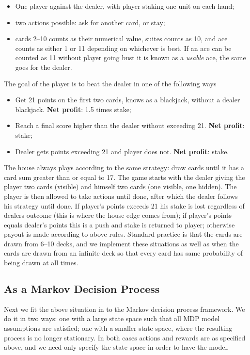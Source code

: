 \begin{itemize}
	\item One player against the dealer, with player staking one unit on each hand;
	\item two actions possible: ask for another card, or stay;
	\item cards 2--10 counts as their numerical value, suites counts as 10, and ace counts as either 1 or 11 depending on whichever is best. If an ace can be counted as 11 without player going bust it is known as a \textit{usable} ace, the same goes for the dealer.
\end{itemize}
The goal of the player is to beat the dealer in one of the following ways
\begin{itemize}
	\item Get 21 points on the first two cards, knows as a blackjack, without a dealer blackjack. \textbf{Net profit}: 1.5 times stake;
	\item Reach a final score higher than the dealer without exceeding 21. \textbf{Net profit}: stake;
	\item Dealer gets points exceeding 21 and player does not. \textbf{Net profit}: stake.
\end{itemize}
The house always plays according to the same strategy: draw cards until it has a card sum greater than or equal to 17. The game starts with the dealer giving the player two cards (visible) and himself two cards (one visible, one hidden). The player is then allowed to take actions until done, after which the dealer follows his strategy until done. If player's points exceeds 21 his stake is lost regardless of dealers outcome (this is where the house edge comes from); if player's points equals dealer's points this is a push and stake is returned to player; otherwise payout is made according to above rules. Standard practice is that the cards are drawn from 6--10 decks, and we implement these situations as well as when the cards are drawn from an infinite deck so that every card has same probability of being drawn at all times.

\subsection{As a Markov Decision Process}
Next we fit the above situation in to the Markov decision process framework. We do it in two ways: one with a large state space such that all MDP model assumptions are satisfied; 
one with a smaller state space,
where the resulting process is  no longer stationary. In both cases actions and rewards are as specified above, and we need only specify the state space in order to have the model.

